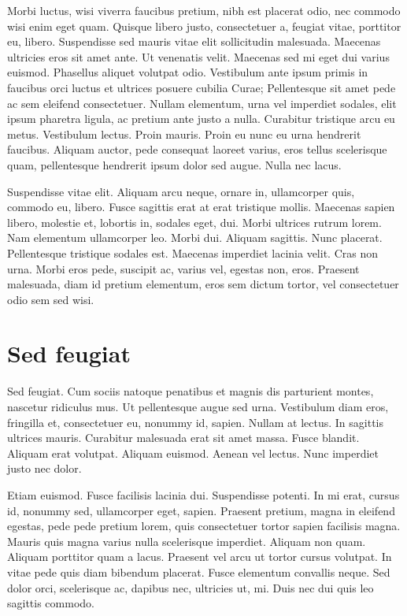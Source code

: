   Morbi luctus, wisi viverra faucibus pretium, nibh est placerat odio,
  nec commodo wisi enim eget quam. Quisque libero justo, consectetuer a,
  feugiat vitae, porttitor eu, libero. Suspendisse sed mauris vitae elit
  sollicitudin malesuada. Maecenas ultricies eros sit amet ante. Ut
  venenatis velit. Maecenas sed mi eget dui varius euismod. Phasellus
  aliquet volutpat odio. Vestibulum ante ipsum primis in faucibus orci
  luctus et ultrices posuere cubilia Curae; Pellentesque sit amet pede
  ac sem eleifend consectetuer. Nullam elementum, urna vel imperdiet
  sodales, elit ipsum pharetra ligula, ac pretium ante justo a
  nulla. Curabitur tristique arcu eu metus. Vestibulum lectus. Proin
  mauris. Proin eu nunc eu urna hendrerit faucibus. Aliquam auctor, pede
  consequat laoreet varius, eros tellus scelerisque quam, pellentesque
  hendrerit ipsum dolor sed augue. Nulla nec lacus.

  Suspendisse vitae elit. Aliquam arcu neque, ornare in, ullamcorper
  quis, commodo eu, libero. Fusce sagittis erat at erat tristique
  mollis. Maecenas sapien libero, molestie et, lobortis in, sodales
  eget, dui. Morbi ultrices rutrum lorem. Nam elementum ullamcorper
  leo. Morbi dui. Aliquam sagittis. Nunc placerat. Pellentesque
  tristique sodales est. Maecenas imperdiet lacinia velit. Cras non
  urna. Morbi eros pede, suscipit ac, varius vel, egestas non,
  eros. Praesent malesuada, diam id pretium elementum, eros sem dictum
  tortor, vel consectetuer odio sem sed wisi.

  \section{Sed feugiat}

  Sed feugiat. Cum sociis natoque penatibus et magnis dis parturient
  montes, nascetur ridiculus mus. Ut pellentesque augue sed
  urna. Vestibulum diam eros, fringilla et, consectetuer eu, nonummy id,
  sapien. Nullam at lectus. In sagittis ultrices mauris. Curabitur
  malesuada erat sit amet massa. Fusce blandit. Aliquam erat
  volutpat. Aliquam euismod. Aenean vel lectus. Nunc imperdiet justo nec
  dolor.

  Etiam euismod. Fusce facilisis lacinia dui. Suspendisse potenti. In mi
  erat, cursus id, nonummy sed, ullamcorper eget, sapien. Praesent
  pretium, magna in eleifend egestas, pede pede pretium lorem, quis
  consectetuer tortor sapien facilisis magna. Mauris quis magna varius
  nulla scelerisque imperdiet. Aliquam non quam. Aliquam porttitor quam
  a lacus.  Praesent vel arcu ut tortor cursus volutpat. In vitae pede
  quis diam bibendum placerat. Fusce elementum convallis neque. Sed
  dolor orci, scelerisque ac, dapibus nec, ultricies ut, mi. Duis nec
  dui quis leo sagittis commodo.



